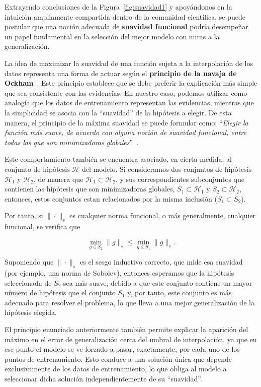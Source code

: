Extrayendo conclusiones de la Figura~\ref{fig:suavidad1} y apoyándonos en la intuición ampliamente compartida dentro de la comunidad científica, se puede postular que una noción adecuada de \textbf{suavidad funcional} podría desempeñar un papel fundamental en la selección del mejor modelo con miras a la generalización.  

La idea de maximizar la suavidad de una función sujeta a la interpolación de los datos representa una forma de actuar según el \textbf{principio de la navaja de Ockham}~\cite{Blumer1987}. Este principio establece que se debe preferir la explicación más simple que sea consistente con las evidencias. En nuestro caso, podemos utilizar como analogía que los datos de entrenamiento representan las evidencias, mientras que la simplicidad se asocia con la ``suavidad'' de la hipótesis a elegir. De esta manera, el principio de la máxima suavidad se puede formular como: ``\textit{Elegir la función más suave, de acuerdo con alguna noción de suavidad funcional, entre todas las que son minimizadoras globales}''~\cite{Belkin2021}.

Este comportamiento también se encuentra asociado, en cierta medida, al conjunto de hipótesis $\mathcal{H}$ del modelo. Si consideramos dos conjuntos de hipótesis $\mathcal{H}_1$ y $\mathcal{H}_2$, de manera que $\mathcal{H}_1 \subset \mathcal{H}_2$, y sus correspondientes subconjuntos que contienen las hipótesis que son minimizadoras globales, $S_1 \subset \mathcal{H}_1$ y $S_2 \subset \mathcal{H}_2$, entonces, estos conjuntos estan relacionados por la misma inclusión ($S_1 \subset S_2$).

Por tanto, si $\| \cdot \|_{s}$ es cualquier norma funcional, o más generalmente, cualquier funcional, se verifica que

\[
    \min_{g \in S_2} \| g \|_{s} \leq \min_{g \in S_1} \| g \|_{s}.
\]

Suponiendo que $\| \cdot \|_{s}$ es el sesgo inductivo correcto, que mide esa suavidad (por ejemplo, una norma de Sobolev), entonces esperamos que la hipótesis seleccionada de $S_2$ sea más suave, debido a que este conjunto contiene un mayor número de hipótesis que el conjunto $S_1$ y, por tanto, este conjunto es más adecuado para resolver el problema, lo que lleva a una mejor generalización de la hipótesis elegida.

El principio enunciado anteriormente también permite explicar la aparición del máximo en el error de generalización cerca del umbral de interpolación, ya que en ese punto el modelo se ve forzado a pasar, exactamente, por cada uno de los puntos de entrenamiento. Esto conduce a una solución única que depende exclusivamente de los datos de entrenamiento, lo que obliga al modelo a seleccionar dicha solución independientemente de su ``suavidad''.

